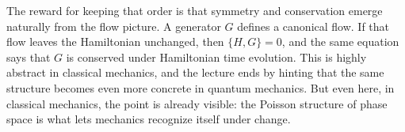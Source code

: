 The reward for keeping that order is that symmetry and conservation emerge naturally from the flow picture. A generator \(G\) defines a canonical flow. If that flow leaves the Hamiltonian unchanged, then \(\{H,G\}=0\), and the same equation says that \(G\) is conserved under Hamiltonian time evolution. This is highly abstract in classical mechanics, and the lecture ends by hinting that the same structure becomes even more concrete in quantum mechanics. But even here, in classical mechanics, the point is already visible: the Poisson structure of phase space is what lets mechanics recognize itself under change.